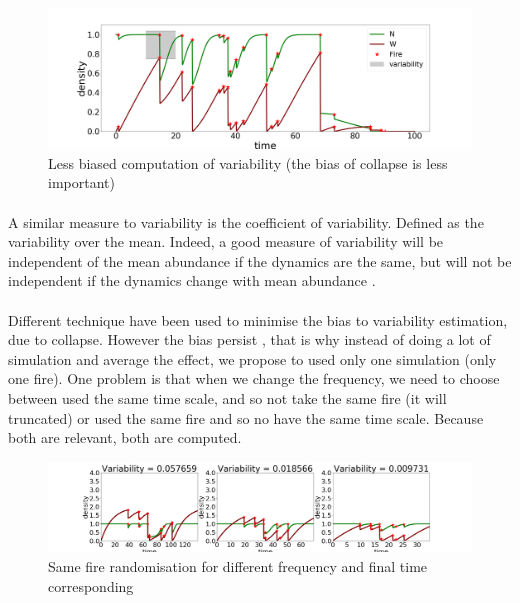 \documentclass{article}
\begin{document}
\begin{figure}[h!]
\centering
\includegraphics[width=12.cm]{time_series_sd_2.png}
\caption{Less biased computation of variability (the bias of collapse is less important)}
\end{figure}


\paragraph{}
A similar measure to variability is the coefficient of variability. Defined as the variability over the mean. Indeed, a good measure of variability will be independent of the mean abundance if the dynamics are the same, but will not be independent if the dynamics change with mean abundance \citep{gaston_measurement_1993, noauthor_temporal_1994}.







\paragraph{}
\label{same_fire}
Different technique have been used to minimise the bias to variability estimation, due to collapse. However the bias persist \citep{seely2004complex}, that is why instead of doing a lot of simulation and average the effect, we propose to used only one simulation (only one fire). One problem is that when we change the frequency, we need to choose between used the same time scale, and so not take the same fire (it will truncated) or used the same fire and so no have the same time scale. Because both are relevant, both are computed. 





\begin{figure}[h!]
\centering
\includegraphics[width=12.cm]{same_2.png}
\caption{Same fire randomisation for different frequency and final time corresponding}
\end{figure}
\end{document}
